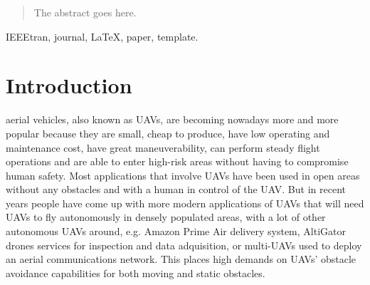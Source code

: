 \documentclass[journal]{IEEEtran}
\begin{document}
\begin{abstract}
The abstract goes here.
\end{abstract}

\begin{IEEEkeywords}
IEEEtran, journal, \LaTeX, paper, template.
\end{IEEEkeywords}


%

\section{Introduction}
%
%
%
%
 aerial vehicles, also known as UAVs, are becoming nowadays more and more popular because they are small, cheap to produce, have low operating and maintenance cost, have great maneuverability, can perform steady flight operations and are able to enter high-risk areas without having to compromise human safety. Most applications that involve UAVs have been used in open areas without any obstacles and with a human in control of the UAV. But in recent years people have come up with more modern applications of UAVs that will need UAVs to fly autonomously in densely populated areas, with a lot of other autonomous UAVs around, e.g. Amazon Prime Air delivery system, AltiGator drones services for inspection and data adquisition, or multi-UAVs used to deploy an aerial communications network. This places high demands on UAVs’ obstacle avoidance capabilities for both moving and static obstacles.
\end{document}
